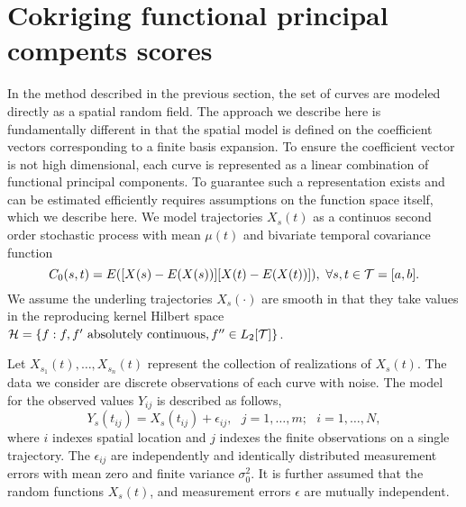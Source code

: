 \section{Cokriging functional principal compents scores} %
\label{sec:cokriging_functional_principal_compents_scores}
In the method described in the previous section, the set of curves are modeled directly as a spatial random field. The approach we describe here is fundamentally different in that the spatial model is defined on the coefficient vectors corresponding to a finite basis expansion. To ensure the coefficient vector is not high dimensional, each curve is represented as a linear combination of functional principal components. To guarantee such a representation exists and can be estimated efficiently requires assumptions on the function space itself, which we describe here. 
  We model trajectories $X_s(t)$ as a continuos second order stochastic process with mean $\mu(t)$ and bivariate temporal covariance function
\begin{equation}
	C_{0}(s,t)=E([X(s)-E(X(s))][X(t)-E(X(t))]),\mbox{ }\forall s,t\in \mathcal{T}=[a,b]. 
\end{equation} 
 We assume the underling trajectories $X_s(\cdot)$ are smooth in that they take values in the reproducing kernel Hilbert space $\mathcal{H}= \{f : f, f' \mbox{ absolutely continuous}, f'' \in L_2[\mathcal{T}]\}$. 

Let $X_{s_1}(t), \dots, X_{s_n}(t)$ represent the collection of realizations of $X_s(t)$. The data we consider are discrete observations of each curve with noise. The model for the observed values $Y_{ij}$ is described as follows,
\[ Y_s(t_{ij})=X_s(t_{ij})+\epsilon_{ij},\mbox{ }j=1,\dots,m;\mbox{ }i=1,\dots,N, \]
where $i$ indexes spatial location and $j$ indexes the finite observations on a single trajectory. The $\epsilon_{ij}$ are independently and identically distributed measurement errors with mean zero and finite variance $\sigma_{0}^{2}.$ It is further assumed that the random functions $X_s(t)$, and measurement errors $\epsilon$ are mutually independent. 

